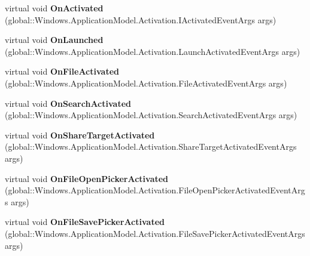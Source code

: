 \begin{DoxyCompactItemize}
\item 
\mbox{\label{class_windows_1_1_u_i_1_1_xaml_1_1_application_a1007269442b51bcb8b6f72fb5c538c4d}} 
virtual void {\bfseries On\+Activated} (global\+::\+Windows.\+Application\+Model.\+Activation.\+I\+Activated\+Event\+Args args)
\item 
\mbox{\label{class_windows_1_1_u_i_1_1_xaml_1_1_application_ac34abc539f620025d7e6026118ec1fb9}} 
virtual void {\bfseries On\+Launched} (global\+::\+Windows.\+Application\+Model.\+Activation.\+Launch\+Activated\+Event\+Args args)
\item 
\mbox{\label{class_windows_1_1_u_i_1_1_xaml_1_1_application_ad3a115248881604e559640ff7d3f1510}} 
virtual void {\bfseries On\+File\+Activated} (global\+::\+Windows.\+Application\+Model.\+Activation.\+File\+Activated\+Event\+Args args)
\item 
\mbox{\label{class_windows_1_1_u_i_1_1_xaml_1_1_application_a361d968000b09b19ff4e794b6550ff86}} 
virtual void {\bfseries On\+Search\+Activated} (global\+::\+Windows.\+Application\+Model.\+Activation.\+Search\+Activated\+Event\+Args args)
\item 
\mbox{\label{class_windows_1_1_u_i_1_1_xaml_1_1_application_a9281a10e995bfc3ce84c4732cd139856}} 
virtual void {\bfseries On\+Share\+Target\+Activated} (global\+::\+Windows.\+Application\+Model.\+Activation.\+Share\+Target\+Activated\+Event\+Args args)
\item 
\mbox{\label{class_windows_1_1_u_i_1_1_xaml_1_1_application_a6349d39f9b31d3d870acad8ce929f8cb}} 
virtual void {\bfseries On\+File\+Open\+Picker\+Activated} (global\+::\+Windows.\+Application\+Model.\+Activation.\+File\+Open\+Picker\+Activated\+Event\+Args args)
\item 
\mbox{\label{class_windows_1_1_u_i_1_1_xaml_1_1_application_ac08cc52e93ef57a27360f3cb1ae256c4}} 
virtual void {\bfseries On\+File\+Save\+Picker\+Activated} (global\+::\+Windows.\+Application\+Model.\+Activation.\+File\+Save\+Picker\+Activated\+Event\+Args args)

\end{DoxyCompactItemize}
